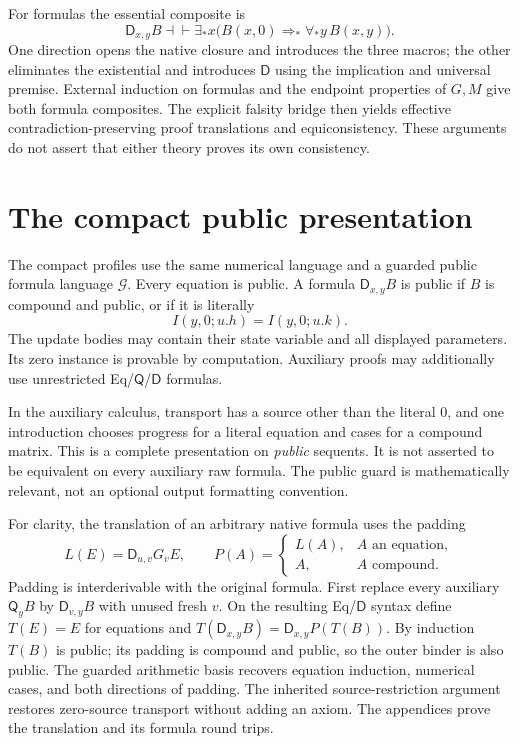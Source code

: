\documentclass[11pt,letterpaper]{article}
\theoremstyle{definition}
\newcommand{\D}{\mathsf D}
\newcommand{\Q}{\mathsf Q}
\newcommand{\A}{\mathcal A}
\begin{document}
For formulas the essential composite is
\[
 \D_{x,y}B\dashv\vdash
 \exists_*x\bigl(B(x,0)\Rightarrow_*\forall_*y\,B(x,y)\bigr).
\]
One direction opens the native closure and introduces the three macros;
the other eliminates the existential and introduces $\D$ using the
implication and universal premise. External induction on formulas and
the endpoint properties of $G,M$ give both formula composites. The
explicit falsity bridge then yields effective contradiction-preserving
proof translations and equiconsistency. These arguments do not assert
that either theory proves its own consistency.

\section{The compact public presentation}
\label{sec:public-boundary}

The compact profiles use the same numerical language and a guarded public
formula language $\mathcal G$. Every equation is public. A formula
$\D_{x,y}B$ is public if $B$ is compound and public, or if it is literally
\[
 I(y,0;u.h)=I(y,0;u.k).
\]
The update bodies may contain their state variable and all displayed
parameters. Its zero instance is provable by computation. Auxiliary
proofs may additionally use unrestricted Eq/$\Q$/$\D$ formulas.

In the auxiliary calculus, transport has a source other than the literal
$0$, and one introduction chooses progress for a literal equation and
cases for a compound matrix. This is a complete presentation on
\emph{public} sequents. It is not asserted to be equivalent on every
auxiliary raw formula. The public guard is mathematically relevant, not
an optional output formatting convention.

For clarity, the translation of an arbitrary native formula uses the
padding
\[
 L(E)=\D_{u,v}G_vE,\qquad
 P(A)=\begin{cases}L(A),&A\text{ an equation},\\A,&A\text{ compound}.
 \end{cases}
\]
Padding is interderivable with the original formula. First replace every
auxiliary $\Q_yB$ by $\D_{v,y}B$ with unused fresh $v$. On the resulting
Eq/$\D$ syntax define $T(E)=E$ for equations and
$T(\D_{x,y}B)=\D_{x,y}P(T(B))$. By induction $T(B)$ is public;
its padding is compound and public, so the outer binder is also public.
The guarded arithmetic basis recovers equation induction, numerical
cases, and both directions of padding. The inherited source-restriction
argument restores zero-source transport without adding an axiom. The
appendices prove the translation and its formula round trips.
\end{document}
